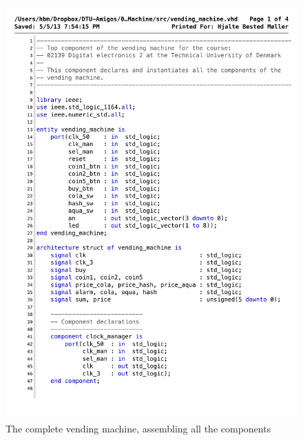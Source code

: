 \begin{figure}[!h]
\centering
\includegraphics[scale=0.6]{figs/vending_machine.pdf}
\caption{The complete vending machine, assembling all the components}
\label{vhd:vending1}
\end{figure}

